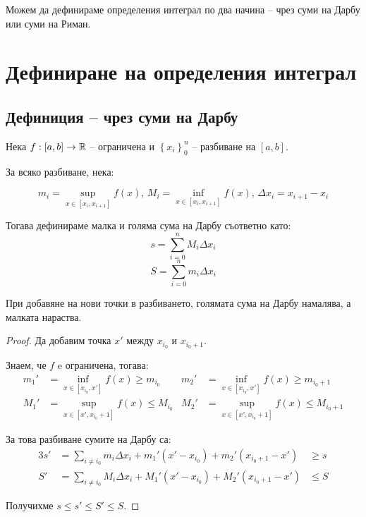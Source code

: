 
Можем да дефинираме определения интеграл по два начина -- чрез суми на Дарбу или суми на Риман.

\section{Дефиниране на определения интеграл}

\subsection{Дефиниция -- чрез суми на Дарбу}
\begin{definition}
    Нека $f: [a,b] \to \mathbb{R}$ -- ограничена и $\left\{x_i\right\}_0^{n}$ -- разбиване на $[a,b]$.

    За всяко разбиване, нека:

    \[m_i = \sup_{x \in [x_i,x_{i+1}]} f(x),\, M_i = \inf_{x \in [x_i,x_{i+1}]} f(x),\,\Delta{x_i} = x_{i+1} - x_i\]

    Тогава дефинираме малка и голяма сума на Дарбу съответно като:
    \[s = \sum_{i=0}^n M_i \Delta x_i\]
    \[S = \sum_{i=0}^n m_i\Delta x_i\]
\end{definition}

\begin{theorem}
    При добавяне на нови точки в разбиването, голямата сума на Дарбу намалява, а малката нараства.

    \begin{proof}
        Да добавим точка $x'$ между $x_{i_0}$ и $x_{i_0+1}$.

        Знаем, че $f$ e ограничена, тогава:
        \begin{align*}
            m_1' & = \inf_{x\in[x_{i_0},x']} f(x)   \geq m_{i_0}   &
            m_2' & = \inf_{x\in[x_{i_0},x']} f(x)   \geq m_{i_0+1}   \\
            M_1' & = \sup_{x\in[x',x_{i_0}+1]} f(x) \leq M_{i_0}   &
            M_2' & = \sup_{x\in[x',x_{i_0}+1]} f(x) \leq M_{i_0+1}
        \end{align*}

        За това разбиване сумите на Дарбу са:
        \begin{alignat*}{3}
            s' & = \sum_{i\neq i_0}m_i\Delta x_i + m_1'(x'-x_{i_0}) + m_2' (x_{i_0+1}-x') & \geq s \\
            S' & = \sum_{i\neq i_0}M_i\Delta x_i + M_1'(x'-x_{i_0}) + M_2' (x_{i_0+1}-x') & \leq S
        \end{alignat*}

        Получихме $s \leq s' \leq S' \leq S$.
    \end{proof}
\end{theorem}

